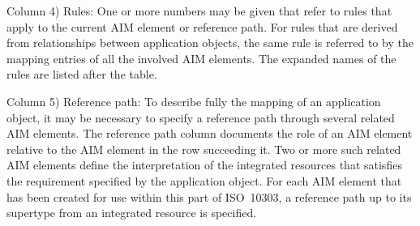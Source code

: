  Column 4) Rules: One or more numbers may be given that
    refer to rules that apply to the current AIM element or
    reference path. For rules that are derived from
    relationships between application objects, the same rule
    is referred to by the mapping entries of all the involved AIM
    elements. The expanded names of the rules are listed after
    the table.

 Column 5) Reference path: To describe fully the mapping
    of an application object, it may be necessary to specify a
    reference path through several related AIM elements. The
    reference path column documents the role of an AIM element
    relative to the AIM element in the row succeeding it.
    Two or more such related AIM elements define the
    interpretation of the integrated resources that satisfies
    the requirement specified by the application object.
    For each AIM element that has been created for use within this
    part of ISO~10303, a reference path up to its supertype from
    an integrated resource is specified.

